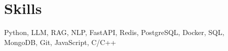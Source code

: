\section*{Skills}
Python, LLM, RAG, NLP, FastAPI, Redis, PostgreSQL, Docker, SQL, MongoDB, Git, JavaScript, C/C++

\vspace{-6.5pt}